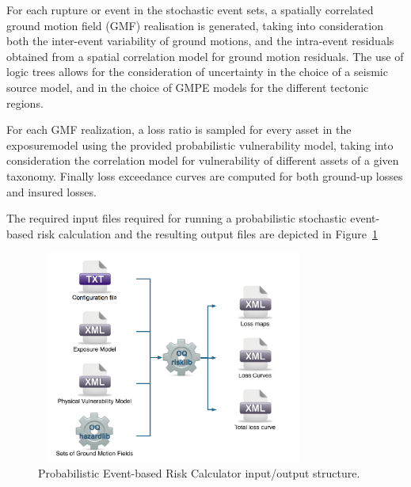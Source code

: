 For each rupture or event in the stochastic event sets, a spatially correlated
ground motion field (GMF) realisation is generated, taking into consideration
both the inter-event variability of ground motions, and the intra-event
residuals obtained from a spatial correlation model for ground motion
residuals. The use of logic trees allows for the consideration of uncertainty
in the choice of a seismic source model, and in the choice of GMPE models for the
different tectonic regions.

For each GMF realization, a loss ratio is sampled for every asset in the
\gls{exposuremodel} using the provided probabilistic vulnerability model, taking
into consideration the correlation model for vulnerability of different assets
of a given taxonomy. Finally loss exceedance curves are computed for both
ground-up losses and insured losses.

The required input files required for running a probabilistic stochastic
event-based risk calculation and the resulting output files are depicted in
Figure~\ref{fig:io-structure-event-based-risk}

\begin{figure}[ht]
\centering
\includegraphics[width=9cm,height=7cm]{figures/risk/io-structure-event-based-risk.pdf}
\caption{Probabilistic Event-based Risk Calculator input/output structure.}
\label{fig:io-structure-event-based-risk}
\end{figure}
